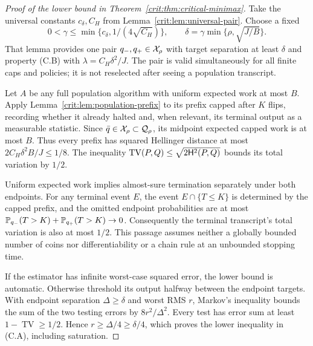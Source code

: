 \begin{proof}[Proof of the lower bound in Theorem~\ref{crit:thm:critical-minimax}]
Take the universal constants $c_\delta,C_H$ from
Lemma~\ref{crit:lem:universal-pair}. Choose a fixed
\[
 0<\gamma\le\min\{c_\delta,1/(4\sqrt{C_H})\},
 \qquad \delta=\gamma\min\{\rho,\sqrt{J/B}\}.
\]
That lemma provides one pair $q_-,q_+\in\mathcal X_\rho$ with target separation at
least $\delta$ and property (C.B) with $\lambda=C_H\delta^2/J$.
The pair is valid simultaneously for all finite caps and policies; it is
not reselected after seeing a population transcript.

Let $A$ be any full population algorithm with uniform expected work at most
$B$. Apply Lemma~\ref{crit:lem:population-prefix} to its prefix capped after
$K$ flips, recording whether it already halted and, when relevant, its
terminal output as a measurable statistic. Since $\bar q\in\mathcal X_\rho\subset
\mathcal Q_\rho$, its midpoint expected capped work is at most $B$.
Thus every prefix has squared Hellinger distance at most
$2C_H\delta^2B/J\le1/8$. The inequality
$\operatorname{TV}(P,Q)\le\sqrt{2\mathsf H^2(P,Q)}$ bounds its total variation
by $1/2$.

Uniform expected work implies almost-sure termination separately under both
endpoints. For any terminal event $E$, the event $E\cap\{T\le K\}$ is
determined by the capped prefix, and the omitted endpoint probabilities
are at most $\mathbb P_{q_-}(T>K)+\mathbb P_{q_+}(T>K)\to0$.
Consequently the terminal transcript's total variation is also at most
$1/2$. This passage assumes neither a globally bounded number of coins
nor differentiability or a chain rule at an unbounded stopping time.

If the estimator has infinite worst-case squared error, the lower bound is
automatic. Otherwise threshold its output halfway between the endpoint
targets. With endpoint separation $\Delta\ge\delta$ and worst RMS $r$,
Markov's inequality bounds the sum of the two testing errors by
$8r^2/\Delta^2$. Every test has error sum at least
$1-\operatorname{TV}\ge1/2$. Hence $r\ge\Delta/4\ge\delta/4$,
which proves the lower inequality in (C.A), including saturation.
\end{proof}

